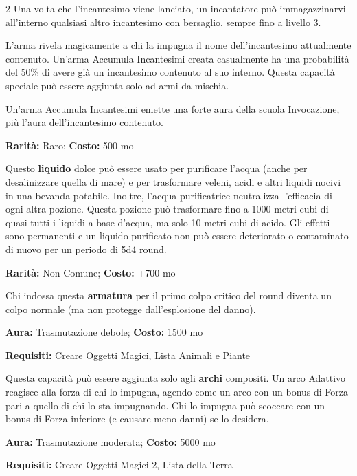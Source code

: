 \begin{multicols}{2}
Una volta che l'incantesimo viene lanciato, un incantatore può immagazzinarvi all'interno qualsiasi altro incantesimo con bersaglio, sempre fino a livello 3.

L'arma rivela magicamente a chi la impugna il nome dell'incantesimo attualmente contenuto. Un'arma Accumula Incantesimi creata casualmente ha una probabilità del 50\% di avere già un incantesimo contenuto al suo interno. Questa capacità speciale può essere aggiunta solo ad armi da mischia.

Un'arma Accumula Incantesimi emette una forte aura della scuola Invocazione, più l'aura dell'incantesimo contenuto.


\textbf{Rarità:} Raro; \textbf{Costo:} 500 mo

Questo \textbf{liquido} dolce può essere usato per purificare l'acqua (anche per desalinizzare quella di mare) e per trasformare veleni, acidi e altri liquidi nocivi in una bevanda potabile. Inoltre, l'acqua purificatrice neutralizza l'efficacia di ogni altra pozione. Questa pozione può trasformare fino a 1000 metri cubi di quasi tutti i liquidi a base d'acqua, ma solo 10 metri cubi di acido. Gli effetti sono permanenti e un liquido purificato non può essere deteriorato o contaminato di nuovo per un periodo di 5d4 round.


\textbf{Rarità:} Non Comune; \textbf{Costo:} +700 mo

Chi indossa questa \textbf{armatura} per il primo colpo critico del round diventa un colpo normale (ma non protegge dall'esplosione del danno).


\textbf{Aura:} Trasmutazione debole; \textbf{Costo:} 1500 mo

\textbf{Requisiti:} Creare Oggetti Magici, Lista Animali e Piante

Questa capacità può essere aggiunta solo agli \textbf{archi} compositi. Un arco Adattivo reagisce alla forza di chi lo impugna, agendo come un arco con un bonus di Forza pari a quello di chi lo sta impugnando. Chi lo impugna può scoccare con un bonus di Forza inferiore (e causare meno danni) se lo desidera.


\textbf{Aura:} Trasmutazione moderata; \textbf{Costo:} 5000 mo

\textbf{Requisiti:} Creare Oggetti Magici 2, Lista della Terra


\end{multicols}
